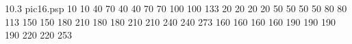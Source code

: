  10.3 pic16.psp 
{}{}{
 10 
 10 
 40 
 70 
 40 
 40 
 70 
 70 
 100 
 100 
 133 
 20 
 20 
 20 
 20 
 50 
 50 
 50 
 50 
 80 
 80 
 113 
 150 
 150 
 180 
 210 
 180 
 180 
 210 
 210 
 240 
 240 
 273 
 160 
 160 
 160 
 160 
 190 
 190 
 190 
 190 
 220 
 220 
 253 
}

